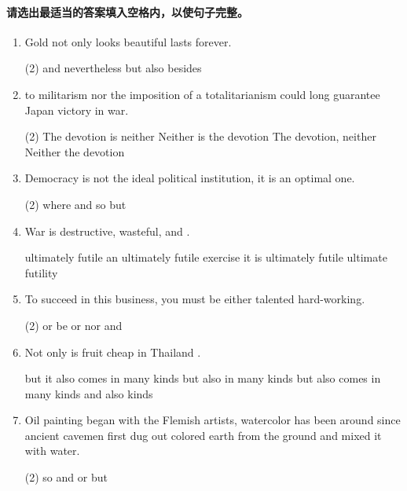 \paragraph{请选出最适当的答案填入空格内，以使句子完整。}

\begin{enumerate}
\item Gold not only looks beautiful \ttu lasts forever.
\begin{tasks}(2)
  \task and
  \task nevertheless
  \task but also
  \task besides
\end{tasks}

\item \ttu to militarism nor the imposition of a totalitarianism could long guarantee Japan victory in war.
\begin{tasks}(2)
  \task The devotion is neither
  \task Neither is the devotion
  \task The devotion, neither
  \task Neither the devotion
\end{tasks}

\item Democracy is not the ideal political institution, \ttu it is an optimal one.
\begin{tasks}(2)
  \task where
  \task and
  \task so
  \task but
\end{tasks}

\item War is destructive, wasteful, and \ttu.
\begin{tasks}
  \task ultimately futile
  \task an ultimately futile exercise
  \task it is ultimately futile
  \task ultimate futility
\end{tasks}

\item To succeed in this business, you must be either talented \ttu hard-working.
\begin{tasks}(2)
  \task or be
  \task or
  \task nor
  \task and
\end{tasks}

\item Not only is fruit cheap in Thailand \ttu.
\begin{tasks}
  \task but it also comes in many kinds
  \task but also in many kinds
  \task but also comes in many kinds
  \task and also kinds
\end{tasks}

\item Oil painting began with the Flemish artists, \ttu watercolor has been around since ancient cavemen first dug out colored earth from the ground and mixed it with water.
\begin{tasks}(2)
  \task so
  \task and
  \task or
  \task but
\end{tasks}


\end{enumerate}
